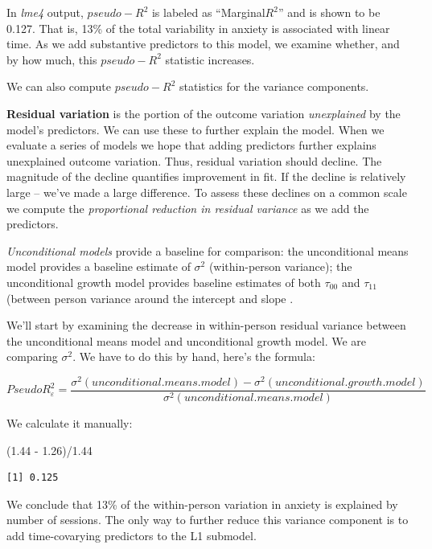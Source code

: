\documentclass[
  11pt,
]{book}
\newenvironment{Shaded}{\begin{snugshade}}{\end{snugshade}}
\newcommand{\FloatTok}[1]{\textcolor[rgb]{0.00,0.00,0.81}{#1}}
\newcommand{\NormalTok}[1]{#1}
\newcommand{\SpecialCharTok}[1]{\textcolor[rgb]{0.00,0.00,0.00}{#1}}
\begin{document}
In \emph{lme4} output, \(pseudo-R^2\) is labeled as ``Marginal\(R^2\)'' and is shown to be 0.127. That is, 13\% of the total variability in anxiety is associated with linear time. As we add substantive predictors to this model, we examine whether, and by how much, this \(pseudo-R^2\) statistic increases.

We can also compute \(pseudo-R^2\) statistics for the variance components.

\textbf{Residual variation} is the portion of the outcome variation \emph{unexplained} by the model's predictors. We can use these to further explain the model. When we evaluate a series of models we hope that adding predictors further explains unexplained outcome variation. Thus, residual variation should decline. The magnitude of the decline quantifies improvement in fit. If the decline is relatively large -- we've made a large difference. To assess these declines on a common scale we compute the \emph{proportional reduction in residual variance} as we add the predictors.

\emph{Unconditional models} provide a baseline for comparison: the unconditional means model provides a baseline estimate of \(\sigma ^{2}\) (within-person variance); the unconditional growth model provides baseline estimates of both \(\tau _{00}\) and \(\tau _{11}\) (between person variance around the intercept and slope .

We'll start by examining the decrease in within-person residual variance between the unconditional means model and unconditional growth model. We are comparing \(\sigma ^{2}\). We have to do this by hand, here's the formula:

\[Pseudo R_{\varepsilon }^{2} = \frac{\sigma^{2}(unconditional. means. model) - \sigma^{2}(unconditional. growth. model)}{\sigma ^{2}(unconditional. means. model)}\]

We calculate it manually:

\begin{Shaded}
\begin{Highlighting}[]
\NormalTok{(}\FloatTok{1.44} \SpecialCharTok{{-}} \FloatTok{1.26}\NormalTok{)}\SpecialCharTok{/}\FloatTok{1.44}
\end{Highlighting}
\end{Shaded}

\begin{verbatim}
[1] 0.125
\end{verbatim}

We conclude that 13\% of the within-person variation in anxiety is explained by number of sessions. The only way to further reduce this variance component is to add time-covarying predictors to the L1 submodel.
\end{document}

